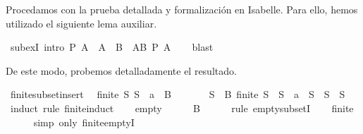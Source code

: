 \begin{isabellebody}
\begin{isamarkuptext}
  Procedamos con la prueba detallada y formalización en Isabelle. Para ello, hemos utilizado el
  siguiente lema auxiliar.%
\end{isamarkuptext}\isamarkuptrue%
\isamarkupfalse%
\ subexI\ {\isacharbrackleft}intro{\isacharbrackright}{\isacharcolon}\ {\isachardoublequoteopen}P\ A\ {\isasymLongrightarrow}\ A\ {\isasymsubseteq}\ B\ {\isasymLongrightarrow}\ {\isasymexists}A{\isasymsubseteq}B{\isachardot}\ P\ A{\isachardoublequoteclose}\isanewline
%
\isadelimproof
\ \ %
\endisadelimproof
%
\isatagproof
{}\isamarkupfalse%
\ blast%
\endisatagproof
{\isafoldproof}%
%
\isadelimproof
%
\endisadelimproof
%
\begin{isamarkuptext}%
De este modo, probemos detalladamente el resultado.%
\end{isamarkuptext}\isamarkuptrue%
\isamarkupfalse%
\ finite{\isacharunderscore}subset{\isacharunderscore}insert{}{\isacharcolon}\isanewline
\ \ {\isachardoublequoteopen}{\isasymlbrakk}finite\ S{\isacharsemicolon}\ S\ {\isasymsubseteq}\ {\isacharbraceleft}a{\isacharbraceright}\ {\isasymunion}\ B\ {\isasymrbrakk}\ {\isasymLongrightarrow}\isanewline
\ \ \ \ \ {\isasymexists}S{\isacharprime}\ {\isasymsubseteq}\ B{\isachardot}\ finite\ S{\isacharprime}\ {\isasymand}\ {\isacharparenleft}S\ {\isacharequal}\ {\isacharbraceleft}a{\isacharbraceright}\ {\isasymunion}\ S{\isacharprime}\ {\isasymor}\ S\ {\isacharequal}\ S{\isacharprime}{\isacharparenright}{\isachardoublequoteclose}\isanewline
%
\isadelimproof
%
\endisadelimproof
%
\isatagproof
{}\isamarkupfalse%
\ {\isacharparenleft}induct\ rule{\isacharcolon}\ finite{\isacharunderscore}induct{\isacharparenright}\isanewline
\ \ \isamarkupfalse%
\ empty\isanewline
\ \ \isamarkupfalse%
\ {\isachardoublequoteopen}{\isacharbraceleft}{\isacharbraceright}\ {\isasymsubseteq}\ B{\isachardoublequoteclose}\isanewline
\ \ \ \ \isamarkupfalse%
\ {\isacharparenleft}rule\ empty{\isacharunderscore}subsetI{\isacharparenright}\isanewline
\ \ \isamarkupfalse%
\ {}{\isacharcolon}{\isachardoublequoteopen}finite\ {\isacharbraceleft}{\isacharbraceright}{\isachardoublequoteclose}\isanewline
\ \ \ \ \isamarkupfalse%
\ {\isacharparenleft}simp\ only{\isacharcolon}\ finite{\isachardot}emptyI{\isacharparenright}\isanewline
\ \ \isamarkupfalse%
\ {\isachardoublequoteopen}{\isacharbraceleft}{\isacharbraceright}\ {\isacharequal}\ {\isacharbraceleft}{\isacharbraceright}{\isachardoublequoteclose}\isanewline

\end{isabellebody}
